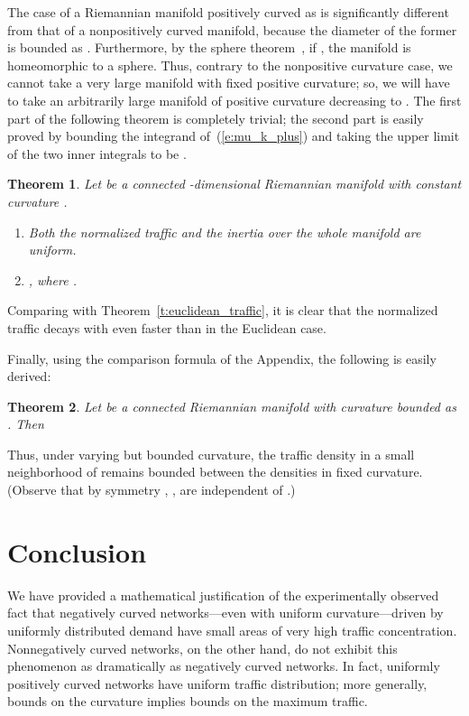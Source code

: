 \documentclass{article}
\newtheorem{theorem}{Theorem}
\begin{document}
The case of a Riemannian manifold positively curved as  is significantly different from that of a nonpositively curved manifold, 
because the diameter of the former is bounded as . Furthermore, by the sphere theorem~\cite[Chap. 13]{docarmo}, 
if , the manifold is homeomorphic to a sphere. 
Thus, contrary to the nonpositive curvature case, we cannot take a very large manifold with fixed positive curvature;  
so, we will have to take an arbitrarily large manifold of positive curvature decreasing to . 
The first part of the following theorem is completely trivial; the second part is easily proved 
by bounding the integrand of~(\ref{e:mu_k_plus}) and taking the upper limit of the two inner integrals to be 
. 

\begin{theorem}
Let  be a connected -dimensional Riemannian manifold with constant curvature . 
\begin{enumerate}
\item Both the normalized traffic  and the inertia  over the whole manifold are uniform.
\item , 
where .  
\end{enumerate} 
\end{theorem}
\noindent
Comparing with Theorem~\ref{t:euclidean_traffic}, 
it is clear that the normalized traffic decays with  even faster than in the Euclidean case. 

Finally, using the comparison formula of the Appendix, the following is easily derived:
\begin{theorem}
Let  be a connected Riemannian manifold with curvature bounded as . 
Then

\end{theorem}
\noindent
Thus, under varying but bounded curvature, 
the traffic density in a small neighborhood of  remains bounded 
between the densities in fixed curvature. 
(Observe that by symmetry , ,  are independent of .) 

\section{Conclusion}

We have provided a mathematical justification of the experimentally observed fact that 
negatively curved networks---even with uniform curvature---driven by uniformly distributed demand 
have small areas of very high traffic concentration. 
Nonnegatively curved networks, on the other hand, do not exhibit this phenomenon 
as dramatically as negatively curved networks.  
In fact, uniformly positively curved networks have uniform traffic distribution; 
more generally, bounds on the curvature implies bounds on the maximum traffic. 
\end{document}
